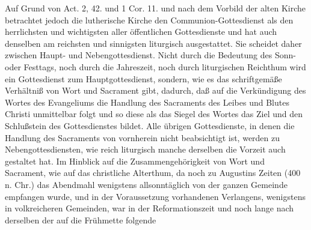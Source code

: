 Auf Grund von Act. 2, 42. und 1 Cor. 11. und nach dem Vorbild der alten Kirche betrachtet jedoch die lutherische Kirche den Communion-Gottesdienst als den herrlichsten und wichtigsten aller öffentlichen Gottesdienste und hat auch denselben am reichsten und sinnigsten liturgisch ausgestattet. Sie scheidet daher zwischen Haupt- und Nebengottesdienst. Nicht durch die Bedeutung des Sonn- oder Festtags, noch durch die Jahreszeit, noch durch liturgischen Reichthum wird ein Gottesdienst zum Hauptgottesdienst, sondern, wie es das schriftgemäße Verhältniß von Wort und Sacrament gibt, dadurch, daß auf die Verkündigung des Wortes des Evangeliums die Handlung des Sacraments des Leibes und Blutes Christi unmittelbar folgt und so diese als das Siegel des Wortes das Ziel und den Schlußstein des Gottesdienstes bildet. Alle übrigen Gottesdienste, in denen die Handlung des Sacraments von vornherein nicht beabsichtigt ist, werden zu Nebengottesdiensten, wie reich liturgisch manche derselben die Vorzeit auch gestaltet hat. Im Hinblick auf die Zusammengehörigkeit von Wort und Sacrament, wie auf das christliche Alterthum, da noch zu Augustins Zeiten (400 n. Chr.) das Abendmahl wenigstens allsonntäglich von der ganzen Gemeinde empfangen wurde, und in der Voraussetzung vorhandenen Verlangens, wenigstens in volkreicheren Gemeinden, war in der Reformationszeit und noch lange nach derselben der auf die Frühmette folgende
